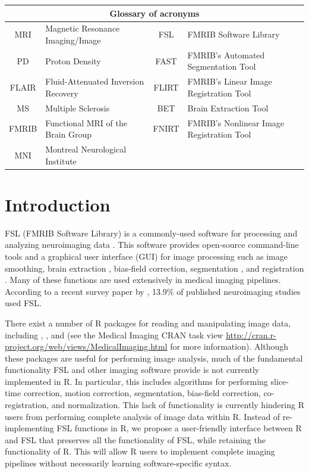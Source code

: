 \documentclass[a4paper]{report}\usepackage[]{graphicx}\usepackage[]{color}
\newcommand{\CRANpkg}[1]{\href{http://CRAN.R-project.org/package=#1}{\pkg{#1}}}%
\let\pkg=\strong
\begin{document}
\begin{article}
{\scriptsize
\begin{tabular}{cl|cl}
\multicolumn{4}{c}{Glossary of acronyms} \\ \hline
MRI & Magnetic Resonance Imaging/Image & FSL & FMRIB Software Library \\
PD & Proton Density & FAST & FMRIB's Automated Segmentation Tool \\
FLAIR & Fluid-Attenuated Inversion Recovery & FLIRT & FMRIB's Linear Image Registration Tool \\
MS & Multiple Sclerosis & BET & Brain Extraction Tool \\
FMRIB & Functional MRI of the Brain Group & FNIRT & FMRIB's Nonlinear Image Registration Tool \\
MNI & Montreal Neurological Institute \\
\hline
\end{tabular}
}


\section{Introduction}
\label{sec:intro}

FSL (FMRIB Software Library) is a commonly-used software for processing and analyzing neuroimaging data \citep{jenkinson_fsl_2012}.  This software provides open-source command-line tools and a graphical user interface (GUI) for image processing such as image smoothing, brain extraction \citep{smith_fast_2002}, bias-field correction, segmentation \citep{zhang_segmentation_2001}, and registration \citep{jenkinson_global_2001, jenkinson_improved_2002}.    Many of these functions are used extensively in medical imaging pipelines.   According to a recent survey paper by \citet{carp_secret_2012}, 13.9\% of published neuroimaging studies used FSL.

There exist a number of R packages for reading and manipulating image data, including \CRANpkg{AnalyzeFMRI} \citep{bordier_temporal_2011}, \CRANpkg{RNiftyReg} \citep{modat_rniftyreg:_2013}, and \CRANpkg{fmri} \citep{tabelow_statistical_2011} (see the Medical Imaging CRAN task view \url{http://cran.r-project.org/web/views/MedicalImaging.html} for more information).  Although these packages are useful for performing image analysis, much of the fundamental functionality FSL and other imaging software provide is not currently implemented in R.  In particular, this includes algorithms for performing slice-time correction, motion correction, segmentation, bias-field correction, co-registration, and normalization. This lack of functionality is currently hindering R users from performing complete analysis of image data within R.  Instead of re-implementing FSL functions in R, we propose a user-friendly interface between R and FSL that preserves all the functionality of FSL, while retaining the functionality of R.  This will allow
R users to implement complete imaging pipelines without necessarily learning software-specific syntax.  


\end{article}
\end{document}
